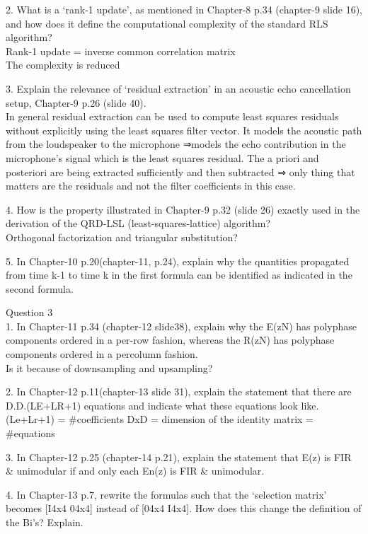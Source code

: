 \documentclass[
  a4paper,
  ,captions=tableheading
]{scrartcl}
\begin{document}
2. What is a `rank-1 update', as mentioned in Chapter-8 p.34 (chapter-9
slide 16), and how does it define the computational complexity of the
standard RLS algorithm?\\
Rank-1 update = inverse common correlation matrix\\
The complexity is reduced

3. Explain the relevance of `residual extraction' in an acoustic echo
cancellation setup, Chapter-9 p.26 (slide 40).\\
In general residual extraction can be used to compute least squares
residuals without explicitly using the least squares filter vector. It
models the acoustic path from the loudspeaker to the microphone ⇒models
the echo contribution in the microphone's signal which is the least
squares residual. The a priori and posteriori are being extracted
sufficiently and then subtracted ⇒ only thing that matters are the
residuals and not the filter coefficients in this case.

4. How is the property illustrated in Chapter-9 p.32 (slide 26) exactly
used in the derivation of the QRD-LSL (least-squares-lattice)
algorithm?\\
Orthogonal factorization and triangular substitution?

5. In Chapter-10 p.20(chapter-11, p.24), explain why the quantities
propagated from time k-1 to time k in the first formula can be
identified as indicated in the second formula.

Question 3\\
1. In Chapter-11 p.34 (chapter-12 slide38), explain why the E(zN) has
polyphase components ordered in a per-row fashion, whereas the R(zN) has
polyphase components ordered in a percolumn fashion.\\
Is it because of downsampling and upsampling?

2. In Chapter-12 p.11(chapter-13 slide 31), explain the statement that
there are D.D.(LE+LR+1) equations and indicate what these equations look
like.\\
(Le+Lr+1) = \#coefficients DxD = dimension of the identity matrix =
\#equations

3. In Chapter-12 p.25 (chapter-14 p.21), explain the statement that E(z)
is FIR \& unimodular if and only each En(z) is FIR \& unimodular.

4. In Chapter-13 p.7, rewrite the formulas such that the `selection
matrix' becomes {[}I4x4 04x4{]} instead of {[}04x4 I4x4{]}. How does
this change the definition of the Bi's? Explain.
\end{document}
